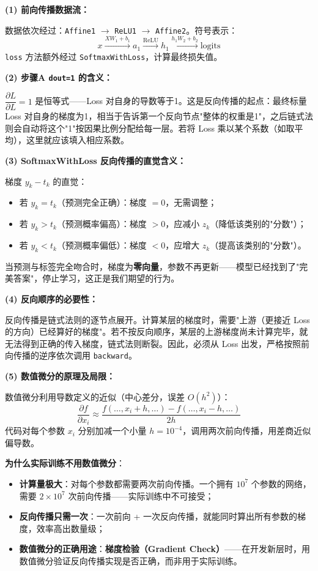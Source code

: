 \documentclass[a4paper,11pt]{ctexart}
\begin{document}
\begin{solutionbox}[参考答案与详细解析]
    \textbf{(1) 前向传播数据流：}

    数据依次经过：\texttt{Affine1} $\to$ \texttt{ReLU1} $\to$ \texttt{Affine2}。符号表示：
    \[
    x \xrightarrow{XW_1+b_1} a_1 \xrightarrow{\text{ReLU}} h_1 \xrightarrow{h_1W_2+b_2} \text{logits}
    \]
    \texttt{loss} 方法额外经过 \texttt{SoftmaxWithLoss}，计算最终损失值。

    \textbf{(2) 步骤A \texttt{dout=1} 的含义：}

    $\dfrac{\partial L}{\partial L} = 1$ 是恒等式——Loss 对自身的导数等于1。这是反向传播的起点：最终标量 Loss 对自身的梯度为1，相当于告诉第一个反向节点"整体的权重是1"，之后链式法则会自动将这个"1"按因果比例分配给每一层。若将 Loss 乘以某个系数（如取平均），这里就应该填入相应系数。

    \textbf{(3) SoftmaxWithLoss 反向传播的直觉含义：}

    梯度 $y_k - t_k$ 的直觉：
    \begin{itemize}
        \item 若 $y_k = t_k$（预测完全正确）：梯度 $= 0$，无需调整；
        \item 若 $y_k > t_k$（预测概率偏高）：梯度 $> 0$，应减小 $z_k$（降低该类别的"分数"）；
        \item 若 $y_k < t_k$（预测概率偏低）：梯度 $< 0$，应增大 $z_k$（提高该类别的"分数"）。
    \end{itemize}
    当预测与标签完全吻合时，梯度为\textbf{零向量}，参数不再更新——模型已经找到了"完美答案"，停止学习，这正是我们期望的行为。

    \textbf{(4) 反向顺序的必要性：}

    反向传播是链式法则的逐节点展开。计算某层的梯度时，需要"上游（更接近 Loss 的方向）已经算好的梯度"。若不按反向顺序，某层的上游梯度尚未计算完毕，就无法得到正确的传入梯度，链式法则断裂。因此，必须从 Loss 出发，严格按照前向传播的逆序依次调用 \texttt{backward}。

    \textbf{(5) 数值微分的原理及局限：}

    数值微分利用导数定义的近似（中心差分，误差 $O(h^2)$）：
    \[
    \frac{\partial f}{\partial x_i} \approx \frac{f(\ldots, x_i+h, \ldots) - f(\ldots, x_i-h, \ldots)}{2h}
    \]
    代码对每个参数 $x_i$ 分别加减一个小量 $h=10^{-4}$，调用两次前向传播，用差商近似偏导数。

    \textbf{为什么实际训练不用数值微分}：
    \begin{itemize}
        \item \textbf{计算量极大}：对每个参数都需要两次前向传播。一个拥有 $10^7$ 个参数的网络，需要 $2 \times 10^7$ 次前向传播——实际训练中不可接受；
        \item \textbf{反向传播只需一次}：一次前向 + 一次反向传播，就能同时算出所有参数的梯度，效率高出数量级；
        \item \textbf{数值微分的正确用途}：\textbf{梯度检验（Gradient Check）}——在开发新层时，用数值微分验证反向传播实现是否正确，而非用于实际训练。
    \end{itemize}


\end{solutionbox}
\end{document}
